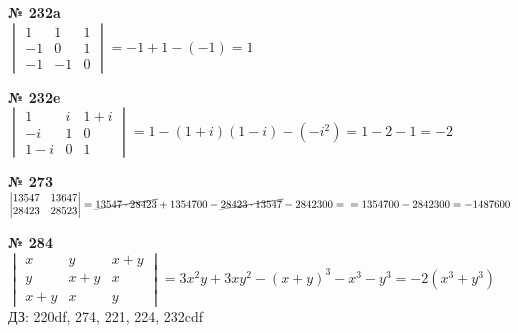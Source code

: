 \documentclass[12pt]{article}
\begin{document}
\vspace{.5cm}
{
	{\textbf{№ 232a} \vspace{.5cm}\\}
	$\begin{vmatrix}
		1 & 1 & 1 \\
		-1 & 0 & 1 \\
		-1 & -1 & 0
	\end{vmatrix} = -1 + 1 - (-1)=1$
	
}

\newpage
{
	{\textbf{№ 232e} \vspace{.5cm}\\}
	$\begin{vmatrix}
		1 & i & 1+i \\
		-i & 1 & 0 \\
		1-i & 0 & 1
	\end{vmatrix} = 1-(1+i)(1-i) - (-i^2) = 1 - 2 - 1=-2$
	
}

\vspace{.5cm}
{
	{\textbf{№ 273} \vspace{.5cm}\\}
	$\begin{vmatrix}
		13547 & 13647 \\
		28423 & 28523 \\
	\end{vmatrix} = \cancel{13547 \cdot 28423} + 1354700 - \cancel{28423 \cdot 13547} - 2842300
	=\\= 1354700 - 2842300 = -1487600$
	
}

\vspace{.5cm}
{
	{\textbf{№ 284} \vspace{.5cm}\\}
	$\begin{vmatrix}
		x & y & x+y \\
		y & x+y & x \\
		x+y & x & y
	\end{vmatrix} = 3x^2y+3xy^2-(x+y)^3-x^3-y^3 = -2(x^3+y^3)$\vspace{.5cm} \\
}
ДЗ: 220df, 274, 221, 224, 232cdf
\vspace{1.4cm}\\
\end{document}
